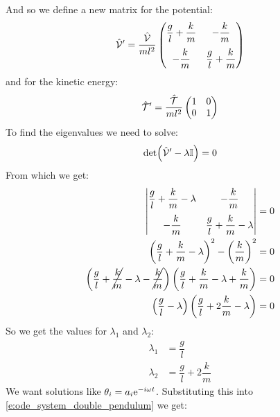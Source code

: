 And so we define a new matrix for the potential:
\begin{equation}
    \hat{\mathcal{V}}' = \dfrac{\hat{\mathcal{V}}}{ml^2}\begin{pmatrix}
        \dfrac{g}{l} + \dfrac{k}{m} & - \dfrac{k}{m}\\[10pt]
        - \dfrac{k}{m} & \dfrac{g}{l} + \dfrac{k}{m}
    \end{pmatrix}
\end{equation}
and for the kinetic energy:
\begin{equation}
    \hat{\mathcal{T}}' = \dfrac{\hat{\mathcal{T}}}{ml^2}\begin{pmatrix}
        1 & 0\\
        0 & 1
    \end{pmatrix}
\end{equation}
To find the eigenvalues we need to solve:
\begin{equation}
    \det(\hat{\mathcal{V}}'-\lambda\mathbb{I}) = 0
\end{equation}
From which we get:
\begin{equation}
    \begin{split}
        \begin{vmatrix}
            \dfrac{g}{l} + \dfrac{k}{m} - \lambda & - \dfrac{k}{m}\\[10pt]
            - \dfrac{k}{m} & \dfrac{g}{l} + \dfrac{k}{m} - \lambda
        \end{vmatrix} &= 0\\
        \left(\dfrac{g}{l} + \dfrac{k}{m} - \lambda\right)^2 -\left(\dfrac{k}{m}\right)^2 & = 0\\
        \left(\dfrac{g}{l} + \cancel{\dfrac{k}{m}} - \lambda-\cancel{\dfrac{k}{m}}\right)\left(\dfrac{g}{l} + \dfrac{k}{m} - \lambda+\dfrac{k}{m}\right) &=0\\
        \left(\dfrac{g}{l} - \lambda\right)\left(\dfrac{g}{l} + 2\dfrac{k}{m} - \lambda\right) &=0
    \end{split}
\end{equation}
So we get the values for $\lambda_1$ and $\lambda_2$:
\begin{equation}
    \begin{split}
        \lambda_1 &= \dfrac{g}{l}\\
        \lambda_2 &= \dfrac{g}{l} + 2\dfrac{k}{m}
    \end{split}
\end{equation}
We want solutions like $\theta_i = a_i\mathrm{e}^{-i\omega t}$. Substituting this into \eqref{e:ode_system_double_pendulum} we get:
